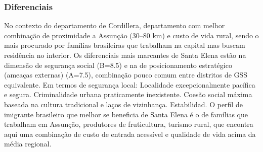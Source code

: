 \subsubsection*{Diferenciais}\label{dif-santa-elena-0317}
No contexto do departamento de Cordillera, departamento com melhor combinação de proximidade a Assunção (30–80 km) e custo de vida rural, sendo o mais procurado por famílias brasileiras que trabalham na capital mas buscam residência no interior. Os diferenciais mais marcantes de Santa Elena estão na dimensão de segurança social (B=8.5) e na de posicionamento estratégico (ameaças externas) (A=7.5), combinação pouco comum entre distritos de GSS equivalente. Em termos de segurança local: Localidade excepcionalmente pacífica e segura. Criminalidade urbana praticamente inexistente. Coesão social máxima baseada na cultura tradicional e laços de vizinhança. Estabilidad. O perfil de imigrante brasileiro que melhor se beneficia de Santa Elena é o de famílias que trabalham em Assunção, produtores de fruticultura, turismo rural, que encontra aqui uma combinação de custo de entrada acessível e qualidade de vida acima da média regional.
